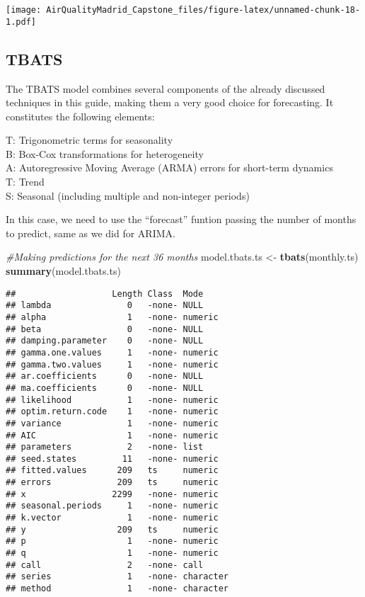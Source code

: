 \documentclass[
]{article}
\newenvironment{Shaded}{\begin{snugshade}}{\end{snugshade}}
\newcommand{\CommentTok}[1]{\textcolor[rgb]{0.56,0.35,0.01}{\textit{#1}}}
\newcommand{\KeywordTok}[1]{\textcolor[rgb]{0.13,0.29,0.53}{\textbf{#1}}}
\newcommand{\NormalTok}[1]{#1}
\newcommand{\StringTok}[1]{\textcolor[rgb]{0.31,0.60,0.02}{#1}}
\begin{document}
\texttt{[image: AirQualityMadrid\_Capstone\_files/figure-latex/unnamed-chunk-18-1.pdf]}

\hypertarget{tbats}{%
\subsection{TBATS}\label{tbats}}

The TBATS model combines several components of the already discussed
techniques in this guide, making them a very good choice for
forecasting. It constitutes the following elements:

T: Trigonometric terms for seasonality\\
B: Box-Cox transformations for heterogeneity\\
A: Autoregressive Moving Average (ARMA) errors for short-term dynamics\\
T: Trend\\
S: Seasonal (including multiple and non-integer periods)

In this case, we need to use the ``forecast'' funtion passing the number
of months to predict, same as we did for ARIMA.

\begin{Shaded}
\begin{Highlighting}[]
\CommentTok{#Making predictions for the next 36 months}
\NormalTok{model.tbats.ts <-}\StringTok{ }\KeywordTok{tbats}\NormalTok{(monthly.ts)}
\KeywordTok{summary}\NormalTok{(model.tbats.ts)}
\end{Highlighting}
\end{Shaded}

\begin{verbatim}
##                   Length Class  Mode     
## lambda               0   -none- NULL     
## alpha                1   -none- numeric  
## beta                 0   -none- NULL     
## damping.parameter    0   -none- NULL     
## gamma.one.values     1   -none- numeric  
## gamma.two.values     1   -none- numeric  
## ar.coefficients      0   -none- NULL     
## ma.coefficients      0   -none- NULL     
## likelihood           1   -none- numeric  
## optim.return.code    1   -none- numeric  
## variance             1   -none- numeric  
## AIC                  1   -none- numeric  
## parameters           2   -none- list     
## seed.states         11   -none- numeric  
## fitted.values      209   ts     numeric  
## errors             209   ts     numeric  
## x                 2299   -none- numeric  
## seasonal.periods     1   -none- numeric  
## k.vector             1   -none- numeric  
## y                  209   ts     numeric  
## p                    1   -none- numeric  
## q                    1   -none- numeric  
## call                 2   -none- call     
## series               1   -none- character
## method               1   -none- character
\end{verbatim}
\end{document}

